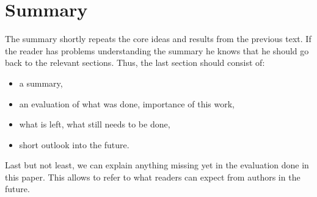 \documentclass[twocolumn]{article}
\begin{document}
\section{Summary}
\label{summary}

The summary shortly repeats the core ideas and results from the
previous text. If the reader has problems understanding the summary
he knows that he should go back to the relevant sections.
Thus, the last section should consist of:

\begin{itemize}
	\item a summary,
	\item an evaluation of what was done, importance of this work,
	\item what is left, what still needs to be done,
        \item short outlook into the future.
\end{itemize}

Last but not least, we can explain anything missing yet in the evaluation
done in this paper. This allows to refer to what readers can expect from
authors in the future.

% 


 
\end{document}
